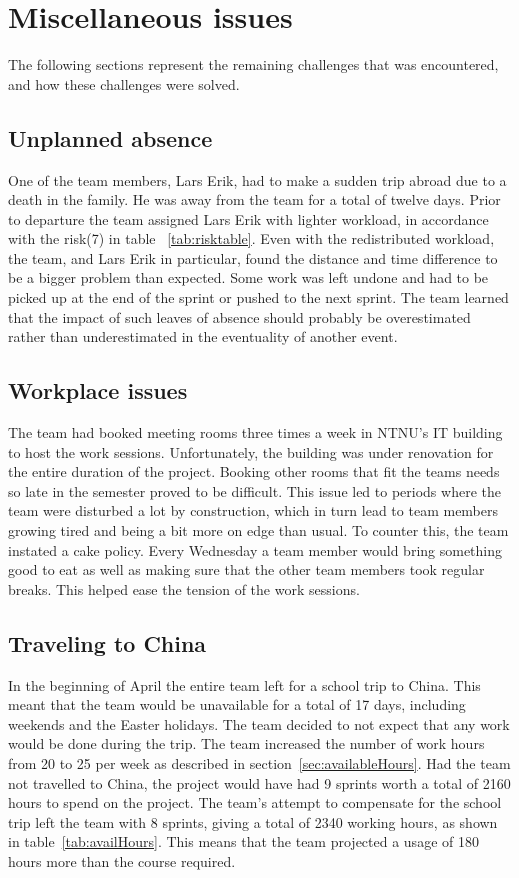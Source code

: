 \section{Miscellaneous issues}
The following sections represent the remaining challenges that was encountered, and how these challenges were solved.

\subsection{Unplanned absence}
One of the team members, Lars Erik, had to make a sudden trip abroad due to a death in the family. He was away from the team for a total of twelve days. Prior to departure the team assigned Lars
Erik with lighter workload, in accordance with the risk(7) in table ~\ref{tab:risktable}. Even with the redistributed workload, the team, and Lars Erik in particular, found the distance and time difference to
be a bigger problem than expected. Some work was left undone and had to be picked up at the end of the sprint or pushed to the next sprint. The team learned that the impact of such leaves of absence should probably be overestimated rather than underestimated in the eventuality of another event.

\subsection{Workplace issues}
The team had booked meeting rooms three times a week in NTNU's IT building to host the work sessions. Unfortunately, the building was under renovation for the entire duration of the project. Booking other rooms that fit the teams needs so late in the semester proved to be difficult. This issue led to periods where the team were disturbed a lot by construction, which in turn lead to team members growing tired and being a bit more on edge than usual. To counter this, the team instated a cake policy. Every Wednesday a team member would bring something good to eat as well as making sure that the other team members took regular breaks. This helped ease the tension of the work sessions.

\subsection{Traveling to China}
In the beginning of April the entire team left for a school trip to China. This meant that the team would be unavailable for a total of 17 days, including weekends and the Easter holidays. The team decided to not expect that any work would be done during the trip. The team increased the number of work hours from 20 to 25 per week as described in section~\ref{sec:availableHours}.
Had the team not travelled to China, the project would have had 9 sprints worth a total of 2160 hours to spend on the project. The team's attempt to compensate for the school trip left the team with 8 sprints, giving a total of 2340 working hours, as shown in table~\ref{tab:availHours}. This means that the team projected a usage of 180 hours more than the course required.
